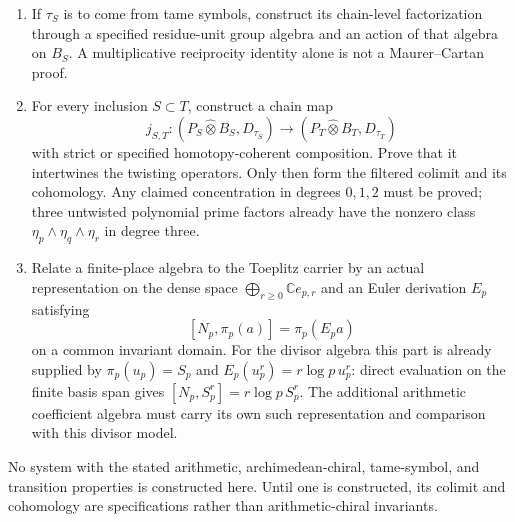 \begin{openproblem}
\begin{enumerate}
\item If \(\tau_S\) is to come from tame symbols, construct its
chain-level factorization through a specified residue-unit group algebra
and an action of that algebra on \(B_S\).  A multiplicative reciprocity
identity alone is not a Maurer--Cartan proof.

\item For every inclusion \(S\subset T\), construct a chain map
\[
 j_{S,T}:(P_S\widehat\otimes B_S,D_{\tau_S})
 \longrightarrow(P_T\widehat\otimes B_T,D_{\tau_T})
\]
with strict or specified homotopy-coherent composition.  Prove that it
intertwines the twisting operators.  Only then form the filtered colimit
and its cohomology.  Any claimed concentration in degrees \(0,1,2\) must
be proved; three untwisted polynomial prime factors already have the
nonzero class \(\eta_p\wedge\eta_q\wedge\eta_r\) in degree three.

\item Relate a finite-place algebra to the Toeplitz carrier by an actual
representation on the dense space \(\bigoplus_{r\geq0}\mathbb C e_{p,r}\)
and an Euler derivation \(E_p\) satisfying
\[
 [N_p,\pi_p(a)]=\pi_p(E_pa)
\]
on a common invariant domain.  For the divisor algebra this part is
already supplied by \(\pi_p(u_p)=S_p\) and
\(E_p(u_p^r)=r\log p\,u_p^r\): direct evaluation on the finite basis span
gives \([N_p,S_p^r]=r\log p\,S_p^r\).
The additional arithmetic coefficient algebra must carry its own such
representation and comparison with this divisor model.
\end{enumerate}

No system with the stated arithmetic, archimedean-chiral, tame-symbol, and
transition properties is constructed here.  Until one is constructed, its
colimit and cohomology are specifications rather than arithmetic-chiral
invariants.
\end{openproblem}
